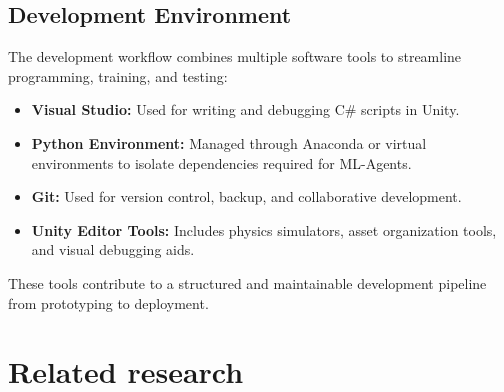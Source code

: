 \documentclass[12pt,oneside,openright,a4paper]{cpe-english-project}
\begin{document}
\subsection{Development Environment}
The development workflow combines multiple software tools to streamline programming, training, and testing:
\begin{itemize}
\item \textbf{Visual Studio:} Used for writing and debugging C\# scripts in Unity.
\item \textbf{Python Environment:} Managed through Anaconda or virtual environments to isolate dependencies required for ML-Agents.
\item \textbf{Git:} Used for version control, backup, and collaborative development.
\item \textbf{Unity Editor Tools:} Includes physics simulators, asset organization tools, and visual debugging aids.
\end{itemize}
These tools contribute to a structured and maintainable development pipeline from prototyping to deployment.

\section{Related research}
\end{document}
